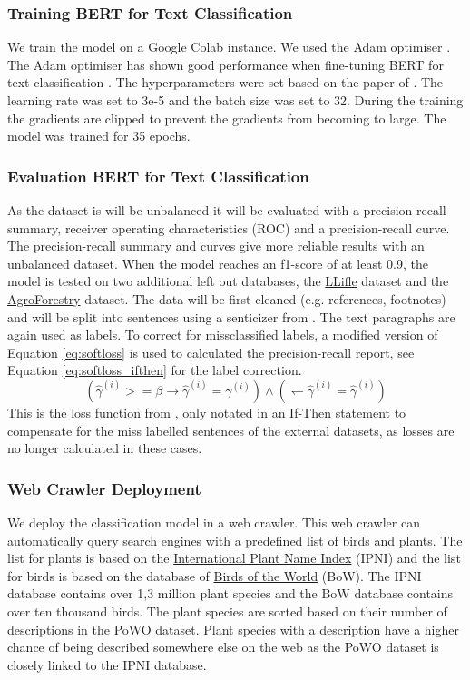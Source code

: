 \documentclass[a4paper, 12pt, oneside]{book} %
\begin{document}
\subsubsection{Training BERT for Text Classification}
We train the model on a Google Colab instance.
We used the Adam optimiser \autocite{kingma_adam_2017}.
The Adam optimiser has shown good performance when fine-tuning BERT for text classification \autocite{you_large_2020}.
The hyperparameters were set based on the paper of \textcite{sun_how_2020}.
The learning rate was set to 3e-5 and the batch size was set to 32.
During the training the gradients are clipped to prevent the gradients from becoming to large.
The model was trained for 35 epochs.

\subsubsection{Evaluation BERT for Text Classification}
As the dataset is will be unbalanced it will be evaluated with a precision-recall summary, receiver operating characteristics (ROC) and a precision-recall curve.
The precision-recall summary and curves give more reliable results with an unbalanced dataset.
When the model reaches an f1-score of at least 0.9, the model is tested on two additional left out databases, the \href{http://www.llifle.com/}{LLifle} dataset and the \href{https://www.worldagroforestry.org/}{AgroForestry} dataset.
The data will be first cleaned (e.g. references, footnotes) and will be split into sentences using a senticizer from \textcite{honnibal_spacy_2020}.
The text paragraphs are again used as labels. 
To correct for missclassified labels, a modified version of Equation \ref{eq:softloss} is used to calculated the precision-recall report, see Equation \ref{eq:softloss_ifthen} for the label correction.
\begin{equation} \label{eq:softloss_ifthen}
(\hat{\gamma}^{(i)} >= \beta \rightarrow \hat{\gamma}^{(i)} = \gamma^{(i)}) \wedge ( \leftharpoondown \hat{\gamma}^{(i)} = \hat{\gamma}^{(i)})
\end{equation}
This is the loss function from \textcite{reed_training_2015}, only notated in an If-Then statement to compensate for the miss labelled sentences of the external datasets, as losses are no longer calculated in these cases.

\subsubsection{Web Crawler Deployment}
We deploy the classification model in a web crawler.
This web crawler can automatically query search engines with a predefined list of birds and plants.
The list for plants is based on the \href{https://www.ipni.org/}{International Plant Name Index} (IPNI) and the list for birds is based on the database of \href{https://birdsoftheworld.org/bow/home}{Birds of the World} (BoW).
The IPNI database contains over 1,3 million plant species and the BoW database contains over ten thousand birds.
The plant species are sorted based on their number of descriptions in the PoWO dataset.
Plant species with a description have a higher chance of being described somewhere else on the web as the PoWO dataset is closely linked to the IPNI database.
\end{document}
